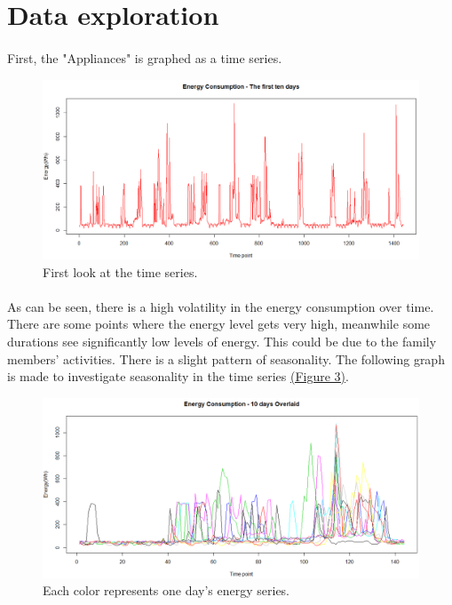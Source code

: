 \documentclass[12pt]{article}
\begin{document}
\section{Data exploration}
\paragraph{}
First, the "Appliances" is graphed as a time series.
\begin{figure}[H]
  \includegraphics[width=\linewidth]{figure2.png}
  \caption{First look at the time series.}
  \label{fig:figure2}
\end{figure}

\paragraph{}
As can be seen, there is a high volatility in the energy consumption over time. There are some points where the energy level gets very high, meanwhile some durations see significantly low levels of energy. This could be due to the family members' activities. There is a slight pattern of seasonality. The following graph is made to investigate seasonality in the time series \href{figure3}{(Figure 3)}.
\begin{figure}[H]
  \includegraphics[width=\linewidth]{figure3.png}
  \caption{Each color represents one day's energy series.}
  \label{fig:figure3}
\end{figure}
\end{document}
